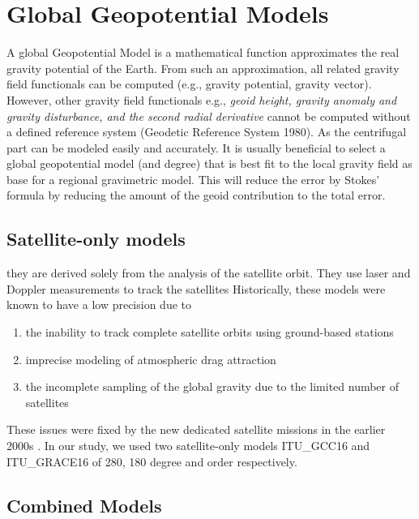 \section{Global Geopotential Models}

A global Geopotential Model is a mathematical function approximates the real gravity potential of the Earth. From such an approximation, all related gravity field functionals can be computed (e.g., gravity potential, gravity vector). However, other gravity field functionals e.g., \textit{geoid height, gravity anomaly and gravity disturbance, and the second radial derivative} cannot be computed without a defined reference system (Geodetic Reference System 1980). As the centrifugal part can be modeled easily and accurately. It is usually beneficial to select a global geopotential model (and degree) that is best fit to the local gravity field as base for a regional gravimetric model. This will reduce the error by Stokes' formula by reducing the amount of the geoid contribution to the total error.

\subsection{Satellite-only models} they are derived solely from the analysis of the satellite orbit. They use laser and Doppler measurements to track the satellites \cite{goce_sp123} Historically, these models were known to have a low precision due to

\begin{enumerate}
	\item the inability to track complete satellite orbits using ground-based stations
	\item imprecise modeling of atmospheric drag attraction
	\item the incomplete sampling of the global gravity due to the limited number of satellites
\end{enumerate}
 
 
 These issues were fixed by the new dedicated satellite missions in the earlier 2000s \cite{rummel}. In our study, we used two satellite-only models ITU\_GCC16 and ITU\_GRACE16 of 280, 180 degree and order respectively. 
 
 \subsection{Combined Models}
 
